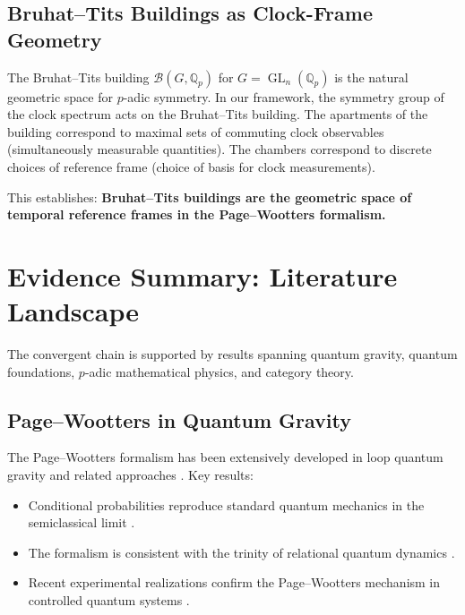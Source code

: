 \documentclass[12pt,a4paper]{article}
\theoremstyle{definition}
\newcommand{\Qp}{\mathbb{Q}_p}
\newcommand{\GL}{\operatorname{GL}}
\newcommand{\bt}{\mathcal{B}}
\begin{document}
\subsection{Bruhat--Tits Buildings as Clock-Frame Geometry}

The Bruhat--Tits building $\bt(G,\Qp)$ for $G = \GL_n(\Qp)$ is the natural geometric space for $p$-adic symmetry. In our framework, the symmetry group of the clock spectrum acts on the Bruhat--Tits building. The apartments of the building correspond to maximal sets of commuting clock observables (simultaneously measurable quantities). The chambers correspond to discrete choices of reference frame (choice of basis for clock measurements).

This establishes: \textbf{Bruhat--Tits buildings are the geometric space of temporal reference frames in the Page--Wootters formalism.}

\section{Evidence Summary: Literature Landscape}

The convergent chain is supported by results spanning quantum gravity, quantum foundations, $p$-adic mathematical physics, and category theory.

\subsection{Page--Wootters in Quantum Gravity}

The Page--Wootters formalism has been extensively developed in loop quantum gravity and related approaches \cite{rovelli1990time,rovelli1991timed,marolf2004page,bojowald2015time,gielen2016quantum}. Key results:
\begin{itemize}[nosep]
\item Conditional probabilities reproduce standard quantum mechanics in the semiclassical limit \cite{gambini2009conditional}.
\item The formalism is consistent with the trinity of relational quantum dynamics \cite{hoehna2019trinity}.
\item Recent experimental realizations confirm the Page--Wootters mechanism in controlled quantum systems \cite{moreva2014time}.
\end{itemize}
\end{document}
